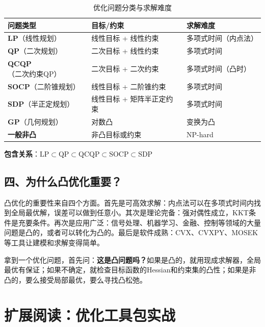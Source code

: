 \begin{table}[htbp]
\centering
\small
\renewcommand{\arraystretch}{1.3}
\begin{tabularx}{\textwidth}{l|X|X}
\toprule
\textbf{问题类型} & \textbf{目标/约束} & \textbf{求解难度} \\
\midrule
\textbf{LP}（线性规划） & 线性目标 + 线性约束 & 多项式时间（内点法） \\
\textbf{QP}（二次规划） & 二次目标 + 线性约束 & 多项式时间 \\
\textbf{QCQP}（二次约束QP） & 二次目标 + 二次约束 & 多项式时间（凸时） \\
\textbf{SOCP}（二阶锥规划） & 线性目标 + 二阶锥约束 & 多项式时间 \\
\textbf{SDP}（半正定规划） & 线性目标 + 矩阵半正定约束 & 多项式时间 \\
\textbf{GP}（几何规划） & 对数凸 & 变换为凸 \\
\midrule
\textbf{一般非凸} & 非凸目标或约束 & NP-hard \\
\bottomrule
\end{tabularx}
\caption{优化问题分类与求解难度}
\end{table}

\textbf{包含关系}：$\text{LP} \subset \text{QP} \subset \text{QCQP} \subset \text{SOCP} \subset \text{SDP}$

\subsection*{四、为什么凸优化重要？}

凸优化的重要性来自四个方面。首先是可高效求解：内点法可以在多项式时间内找到全局最优解，误差可以做到任意小。其次是理论完备：强对偶性成立，KKT条件是充要条件。再次是应用广泛：信号处理、机器学习、金融、控制等领域的大量问题是凸的，或者可以转化为凸的。最后是软件成熟：CVX、CVXPY、MOSEK等工具让建模和求解变得简单。

\begin{insightbox}[title=实用建议]
拿到一个优化问题，首先问：\textbf{这是凸问题吗？}如果是凸的，就用现成求解器，全局最优有保证；如果不确定，就检查目标函数的Hessian和约束集的凸性；如果是非凸的，要么接受局部最优，要么寻找凸松弛。
\end{insightbox}

\section*{扩展阅读：优化工具包实战}

